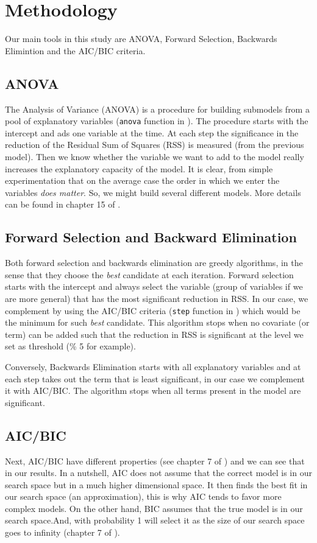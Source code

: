 \documentclass[12pt]{article}
\begin{document}
\section{Methodology}\label{sec:themethod}
Our main tools in this study are ANOVA, Forward Selection, Backwards Elimintion and 
the AIC/BIC criteria.
\subsection{ANOVA}
The Analysis of Variance (ANOVA) is a procedure for building submodels from a pool of
explanatory variables (\texttt{anova} function in \cite{R}). The procedure starts with the intercept and ads one variable
at the time. At each step the significance in the reduction of the Residual Sum of Squares (RSS) is measured (from the previous model). Then we know whether the variable 
we want to add to the model really increases the explanatory capacity of the model. It is clear, from simple experimentation that on the average case the order in which we enter the variables \emph{does matter}. So, we
might build several different models.
More details can be found in chapter 15 of \cite{ARA}.

\subsection{Forward Selection and Backward Elimination}
Both forward selection and backwards elimination are greedy algorithms, in the sense
that they choose the \emph{best} candidate at each iteration. Forward selection starts
with the intercept and always select the variable (group of variables if we are more general) that has the most significant reduction in RSS. In our case, we complement by
using the AIC/BIC criteria (\texttt{step} function in \cite{R}) which would be the minimum for such \emph{best} candidate. This algorithm stops when no covariate (or term) can be added such that the reduction in RSS is significant
at the level we set as threshold (\% 5 for example).

Conversely, Backwards Elimination starts with all explanatory variables and at each step takes out the term
that is least significant, in our case we complement it with AIC/BIC. The algorithm stops when all terms present
in the model are significant.
\subsection{AIC/BIC}
Next, AIC/BIC have different properties (see chapter 7 of \cite{ESL}) and we can see that in our results.
In a nutshell, AIC does not assume that the correct model is in our search space but in a much higher dimensional space.
It then finds the best fit in our search space (an approximation), this is why AIC tends to favor more complex models.
On the other hand, BIC assumes that the true model is in our search space.And, with probability 1 will select it
as the size of our search space goes to infinity (chapter 7 of \cite{ESL}).
\end{document}
